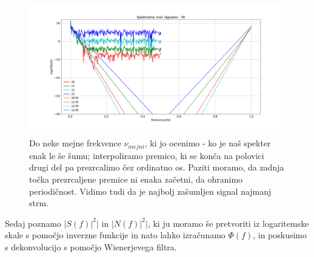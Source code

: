 \documentclass[11pt, a4paper]{article}
\begin{document}
\begin{figure}[H]
\includegraphics[width=16cm, height=6cm]{druga_drugi3fit.png}
\caption{Do neke mejne frekvence $\nu_{mejni}$, ki jo ocenimo - ko je naš spekter enak le še šumu; interpoliramo premico, ki se konča na polovici drugi del pa prezrcalimo čez ordinatno os. Paziti moramo, da zadnja točka prezrcaljene premice ni enaka začetni, da ohranimo periodičnost. Vidimo tudi da je najbolj zašumljen signal najmanj strm.}  
\end{figure}
Sedaj poznamo $|S(f)|^2|$ in $|N(f)|^2|$, ki ju moramo še pretvoriti iz logaritemske skale s pomočjo inverzne funkcije in nato lahko izračunamo $\Phi(f)$, in poskusimo s dekonvolucijo s pomočjo Wienerjevega filtra.
\end{document}
